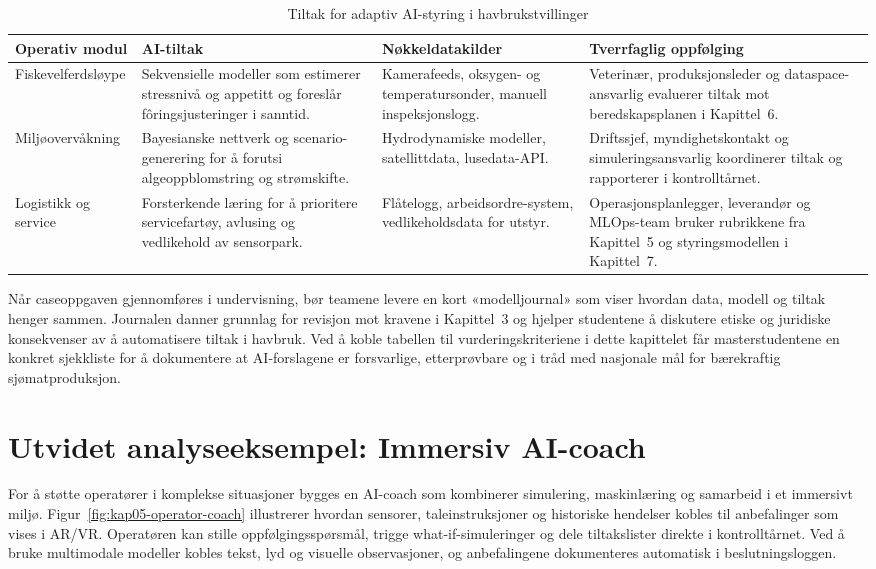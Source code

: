 \begin{table}[htbp]
    \centering
    \caption{Tiltak for adaptiv AI-styring i havbrukstvillinger}
    \label{tab:havbruk-ai-styring}
    \begin{tabular}{p{3.6cm}p{4.2cm}p{3.8cm}p{4.0cm}}
        \toprule
        \textbf{Operativ modul} & \textbf{AI-tiltak} & \textbf{Nøkkeldatakilder} & \textbf{Tverrfaglig oppfølging} \\
        \midrule
        Fiskevelferdsløype & Sekvensielle modeller som estimerer stressnivå og appetitt og foreslår fôringsjusteringer i sanntid. & Kamerafeeds, oksygen- og temperatursonder, manuell inspeksjonslogg. & Veterinær, produksjonsleder og dataspace-ansvarlig evaluerer tiltak mot beredskapsplanen i Kapittel~6. \\
        \addlinespace
        Miljøovervåkning & Bayesianske nettverk og scenario-generering for å forutsi algeoppblomstring og strømskifte. & Hydrodynamiske modeller, satellittdata, lusedata-API. & Driftssjef, myndighetskontakt og simuleringsansvarlig koordinerer tiltak og rapporterer i kontrolltårnet. \\
        \addlinespace
        Logistikk og service & Forsterkende læring for å prioritere servicefartøy, avlusing og vedlikehold av sensorpark. & Flåtelogg, arbeidsordre-system, vedlikeholdsdata for utstyr. & Operasjonsplanlegger, leverandør og MLOps-team bruker rubrikkene fra Kapittel~5 og styringsmodellen i Kapittel~7. \\
        \bottomrule
    \end{tabular}
\end{table}

Når caseoppgaven gjennomføres i undervisning, bør teamene levere en kort «modelljournal» som viser hvordan data, modell og tiltak henger sammen. Journalen danner grunnlag for revisjon mot kravene i Kapittel~3 og hjelper studentene å diskutere etiske og juridiske konsekvenser av å automatisere tiltak i havbruk. Ved å koble tabellen til vurderingskriteriene i dette kapittelet får masterstudentene en konkret sjekkliste for å dokumentere at AI-forslagene er forsvarlige, etterprøvbare og i tråd med nasjonale mål for bærekraftig sjømatproduksjon.\citep{nfd2023sjomatmelding}

\section{Utvidet analyseeksempel: Immersiv AI-coach}
For å støtte operatører i komplekse situasjoner bygges en AI-coach som kombinerer simulering, maskinlæring og samarbeid i et immersivt miljø. Figur~\ref{fig:kap05-operator-coach} illustrerer hvordan sensorer, taleinstruksjoner og historiske hendelser kobles til anbefalinger som vises i AR/VR. Operatøren kan stille oppfølgingsspørsmål, trigge what-if-simuleringer og dele tiltakslister direkte i kontrolltårnet. Ved å bruke multimodale modeller kobles tekst, lyd og visuelle observasjoner, og anbefalingene dokumenteres automatisk i beslutningsloggen.

